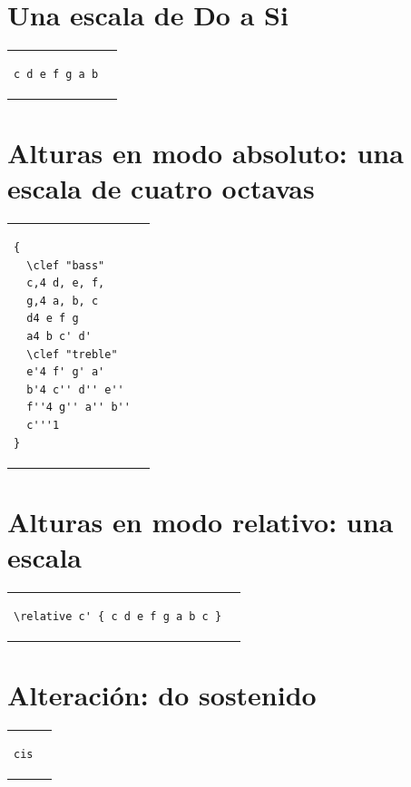 \documentclass[a4paper,10pt,oneside,headinclude,titlepage]{article} %
\begin{document}
\section*{Una escala de Do a Si}
\begin{tabular}{m{2cm}m{2cm}}
\begin{verbatim}
c d e f g a b
\end{verbatim}
&
\begin[fragment]{lilypond}
c d e f g a b
\end{lilypond}
\end{tabular}

\section*{Alturas en modo absoluto: una escala de cuatro octavas}
\begin{tabular}{m{3cm}m{2cm}}
\begin{verbatim}
{
  \clef "bass"
  c,4 d, e, f,
  g,4 a, b, c 
  d4 e f g
  a4 b c' d'
  \clef "treble"
  e'4 f' g' a'
  b'4 c'' d'' e''
  f''4 g'' a'' b''
  c'''1
}
\end{verbatim}
&
\begin[fragment,staffsize=15,line-width=13\cm]{lilypond}
{
  \clef "bass"
  c,4 d, e, f,
  g,4 a, b, c 
  d4 e f g
  a4 b c' d'
  \clef "treble"
  e'4 f' g' a'
  b'4 c'' d'' e''
  f''4 g'' a'' b''
  c'''1
}
\end{lilypond}
\end{tabular}

\section*{Alturas en modo relativo: una escala}
\begin{tabular}{m{6cm}m{2cm}}
\begin{verbatim}
\relative c' { c d e f g a b c }
\end{verbatim}
&
\begin[fragment]{lilypond}
\relative c' { c d e f g a b c }
\end{lilypond}
\end{tabular}

\section*{Alteración: do sostenido}
\begin{tabular}{m{2cm}m{2cm}}
\begin{verbatim}
cis
\end{verbatim}
&
\begin[fragment,relative=2,notime]{lilypond}
cis
\end{lilypond}
\end{tabular}
\end{document}
